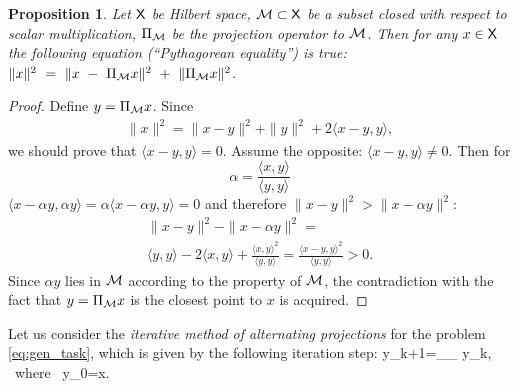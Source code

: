 \documentclass[sii]{ipart}
\newtheorem{proposition}{Proposition}
\begin{document}
\begin{proposition} \label{prop:pythaprop}
	Let $\mathsf{X}$ be Hilbert space, $\mathcal{M} \subset \mathsf{X}$ be a subset closed with respect to scalar multiplication, $\Pi_{\mathcal{M}}$ be the projection operator to $\mathcal{M}$. Then for any $x \in \mathsf{X}$ the following equation (``Pythagorean equality'') is true: $\|x\|^2~=~\|x~-~\Pi_{\mathcal{M}} x\|^2~+~\|\Pi_{\mathcal{M}} x\|^2$.
\end{proposition}

\begin{proof}
	Define $y = \Pi_{\mathcal{M}} x$. Since
	\begin{gather*}
	\|x\|^2 = \|x - y \|^2 + \|y \|^2 + 2 \langle x - y, y \rangle,
	\end{gather*}
    we should prove that $\langle x - y, y \rangle = 0$.
	Assume the opposite: $\langle x - y, y \rangle \ne 0$. Then for
	\begin{equation*}
	\alpha = \frac{\langle x, y \rangle}{\langle y, y \rangle}
	\end{equation*}
    $\langle x - \alpha y, \alpha y \rangle = \alpha \langle x - \alpha y, y \rangle = 0$
    and  therefore $\|x - y\|^2 > \|x - \alpha y\|^2$:
	\begin{gather*}
	\|x - y\|^2 - \|x - \alpha y\|^2 = \\\langle y, y \rangle - 2 \langle x, y \rangle + \frac{\langle x, y \rangle ^ 2}{\langle y, y \rangle} =
    \frac{\langle x - y, y \rangle^2}{\langle y, y \rangle} > 0.
	\end{gather*}
	Since 	$\alpha y$ lies in $\mathcal{M}$ according to the property of $\mathcal{M}$,
    the contradiction with the fact that $y = \Pi_{\mathcal{M}} x$ is the closest point to $x$ is acquired.
\end{proof}

Let us consider the \emph{iterative method of alternating projections} for the problem \eqref{eq:gen_task},
which is given by the following iteration step:
\be
\label{eq:iter}
y_{k+1}=\Pi_\calH \Pi_{\calM} y_{k}, \mbox{\ where\ } y_{0}=x.
\ee
\end{document}

